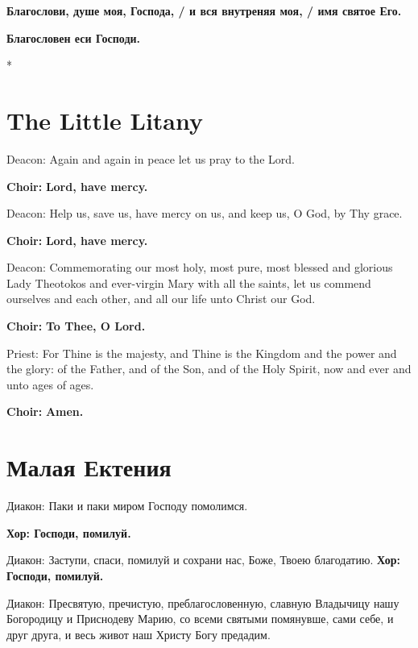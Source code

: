 \documentclass[12pt,a4paper,titlepage]{report}
\begin{document}
\begin{paracol}[1]{2}
  \textbf{Благослови, душе моя, Господа, / и вся внутреняя моя, / имя святое Его.}

  \textbf{Благословен еси Господи.}


  \switchcolumn[0]*

  \section*{The Little Litany}

  Deacon: Again and again in peace let us pray to the Lord.

  \textbf{Choir:} \textbf{Lord, have mercy.}

  Deacon: Help us, save us, have mercy on us, and keep us, O God, by Thy grace.

  \textbf{Choir:} \textbf{Lord, have mercy.}

  Deacon: Commemorating our most holy, most pure, most blessed and glorious Lady Theotokos and ever-virgin Mary with all the saints, let us commend ourselves and each other, and all our life unto Christ our God.

  \textbf{Choir:} \textbf{To Thee, O Lord.}

  Priest: For Thine is the majesty, and Thine is the Kingdom and the power and the glory: of the Father, and of the Son, and of the Holy Spirit, now and ever and unto ages of ages.

  \textbf{Choir:} \textbf{Amen.}

  \switchcolumn[1]

  \section*{Малая Ектения}

  Диакон: Паки и паки миром Господу помолимся.

  \textbf{Хор: Господи, помилуй.}

  Диакон: Заступи, спаси, помилуй и сохрани нас, Боже, Твоею благодатию.
  \textbf{Хор: Господи, помилуй.}

  Диакон: Пресвятую, пречистую, преблагословенную, славную Владычицу нашу Богородицу и Приснодеву Марию, со всеми святыми помянувше, сами себе, и друг друга, и весь живот наш Христу Богу предадим.


\end{paracol}
\end{document}
